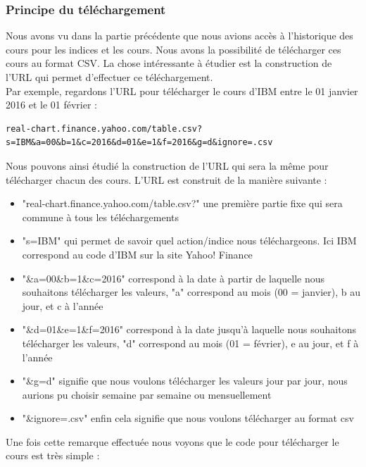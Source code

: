 \subsubsection{Principe du téléchargement}

Nous avons vu dans la partie précédente que nous avions accès à l'historique des cours pour les indices et les cours. Nous avons la possibilité de télécharger ces cours au format CSV. La chose intéressante à étudier est la construction de l'URL qui permet d'effectuer ce téléchargement. \\ 

Par exemple, regardons l'URL pour télécharger le cours d'IBM entre le 01 janvier 2016 et le 01 février : 
\begin{lstlisting}
real-chart.finance.yahoo.com/table.csv?s=IBM&a=00&b=1&c=2016&d=01&e=1&f=2016&g=d&ignore=.csv
\end{lstlisting}
Nous pouvons ainsi étudié la construction de l'URL qui sera la même pour télécharger chacun des cours. L'URL est construit de la manière suivante : 
\begin{itemize} 
\item "real-chart.finance.yahoo.com/table.csv?" une première partie fixe qui sera commune à tous les téléchargements 
\item "s=IBM" qui permet de savoir quel action/indice nous téléchargeons. Ici IBM correspond au code d'IBM sur la site Yahoo! Finance
\item "\&a=00\&b=1\&c=2016" correspond à la date à partir de laquelle nous souhaitons télécharger les valeurs, "a" correspond au mois (00 = janvier), b au jour, et c à l'année
\item "\&d=01\&e=1\&f=2016" correspond à la date jusqu'à laquelle nous souhaitons télécharger les valeurs, "d" correspond au mois (01 = février), e au jour, et f à l'année
\item "\&g=d" signifie que nous voulons télécharger les valeurs jour par jour, nous aurions pu choisir semaine par semaine ou mensuellement
\item "\&ignore=.csv" enfin cela signifie que nous voulons télécharger au format csv
\end{itemize}

Une fois cette remarque effectuée nous voyons que le code pour télécharger le cours est très simple : 

